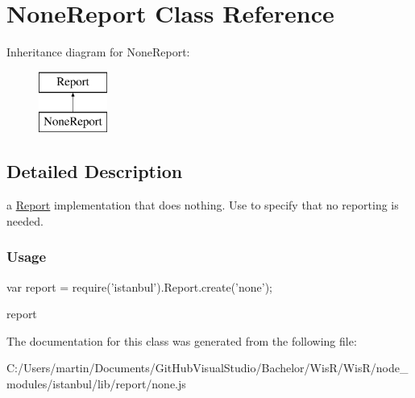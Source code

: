 \hypertarget{class_none_report}{}\section{None\+Report Class Reference}
\label{class_none_report}
Inheritance diagram for None\+Report\+:\begin{figure}[H]
\begin{center}
\leavevmode
\includegraphics[height=2.000000cm]{class_none_report}
\end{center}
\end{figure}


\subsection{Detailed Description}
a {\ttfamily \hyperlink{class_report}{Report}} implementation that does nothing. Use to specify that no reporting is needed.

\subsubsection*{Usage }

\begin{DoxyVerb} var report = require('istanbul').Report.create('none');
\end{DoxyVerb}


report  

The documentation for this class was generated from the following file\+:\begin{DoxyCompactItemize}
\item 
C\+:/\+Users/martin/\+Documents/\+Git\+Hub\+Visual\+Studio/\+Bachelor/\+Wis\+R/\+Wis\+R/node\+\_\+modules/istanbul/lib/report/none.\+js\end{DoxyCompactItemize}
